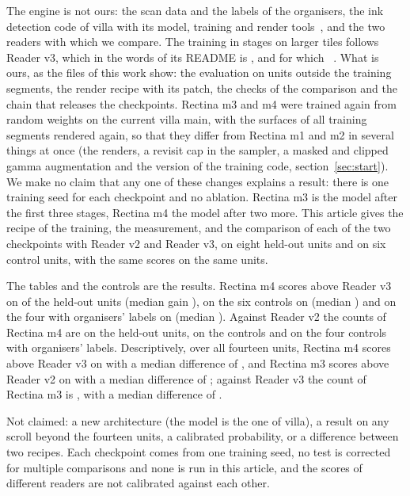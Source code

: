 The engine is not ours: the scan data and the labels of the organisers, the ink detection code of villa with its model, training and render tools~\cite{villa}, and the two readers with which we compare. The training in stages on larger tiles follows Reader v3, which in the words of its README is \RdrQuoteOne{}, and for which \RdrQuoteTwo{}~\cite{readerthree}. What is ours, as the files of this work show: the evaluation on units outside the training segments, the render recipe with its patch, the checks of the comparison and the chain that releases the checkpoints. Rectina m3 and m4 were trained again from random weights on the current villa main, with the surfaces of all \TrainSegN{} training segments rendered again, so that they differ from Rectina m1 and m2 in several things at once (the renders, a revisit cap in the sampler, a masked and clipped gamma augmentation and the version of the training code, section~\ref{sec:start}). We make no claim that any one of these changes explains a result: there is one training seed for each checkpoint and no ablation. Rectina m3 is the model after the first three stages, Rectina m4 the model after two more. This article gives the recipe of the training, the measurement, and the comparison of each of the two checkpoints with Reader v2 and Reader v3, on eight held-out units and on six control units, with the same scores on the same units.

The tables and the controls are the results. Rectina m4 scores above Reader v3 on \MfHeldKTextThree{} of the held-out units (median gain \MfHeldMedianDiffThreeAuc{}), on the six controls on \MfCtrlKTextThree{} (median \MfCtrlMedianDiffThreeAuc{}) and on the four with organisers' labels on \MfOrgKTextThree{} (median \MfOrgMedianDiffThreeAuc{}). Against Reader v2 the counts of Rectina m4 are \MfHeldKTextTwo{} on the held-out units, \MfCtrlKTextTwo{} on the controls and \MfOrgKTextTwo{} on the four controls with organisers' labels. Descriptively, over all fourteen units, Rectina m4 scores above Reader v3 on \MfAllKTextThree{} with a median difference of \MfAllMedianDiffThreeAuc{}, and Rectina m3 scores above Reader v2 on \MtAllKTextTwo{} with a median difference of \MtAllMedianDiffTwoAuc{}; against Reader v3 the count of Rectina m3 is \MtAllKTextThree{}, with a median difference of \MtAllMedianDiffThreeAuc{}.

Not claimed: a new architecture (the model is the one of villa), a result on any scroll beyond the fourteen units, a calibrated probability, or a difference between two recipes. Each checkpoint comes from one training seed, no test is corrected for multiple comparisons and none is run in this article, and the scores of different readers are not calibrated against each other.

